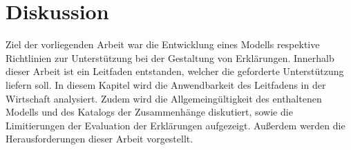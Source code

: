 \chapter{Diskussion}

Ziel der vorliegenden Arbeit war die Entwicklung eines Modells respektive Richtlinien zur Unterstützung bei der Gestaltung von Erklärungen. Innerhalb dieser Arbeit ist ein Leitfaden entstanden, welcher die geforderte Unterstützung liefern soll. In diesem Kapitel wird die Anwendbarkeit des Leitfadens in der Wirtschaft analysiert. Zudem wird die Allgemeingültigkeit des enthaltenen Modells und des Katalogs der Zusammenhänge diskutiert, sowie die Limitierungen der Evaluation der Erklärungen aufgezeigt. Außerdem werden die Herausforderungen dieser Arbeit vorgestellt.





